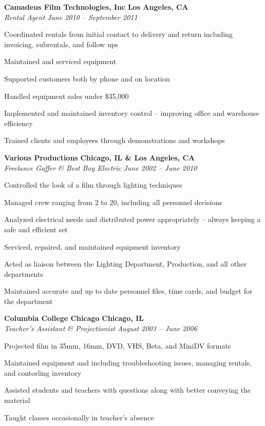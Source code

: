 \documentclass[10pt,letterpaper]{article}			%
\newcommand{\JobHeader}[4]{							%
			\vspace{-.4em}
			\textbf{#1}
			\hfill
			\textbf{#2}
			\\
			\emph{#3}
			\hfill
			\emph{#4}\par
			\vspace{-1em}
			}
\begin{document}
	\JobHeader{Camadeus Film Technologies, Inc}{Los Angeles, CA}{Rental Agent}{June 2010 -- September 2011}
		\begin{itemize*}
		\item Coordinated rentals from initial contact to delivery and return including invoicing, subrentals, and follow ups
		\item Maintained and serviced equipment
		\item Supported customers both by phone and on location
		\item Handled equipment sales under \$35,000
		\item Implemented and maintained inventory control -- improving office and warehouse efficiency
		\item Trained clients and employees through demonstrations and workshops
		\end{itemize*}

	\JobHeader{Various Productions}{Chicago, IL \& Los Angeles, CA}{Freelance Gaffer \& Best Boy Electric}{June 2002 -- June 2010}
		\begin{itemize*}
		\item Controlled the look of a film through lighting techniques 
		\item Managed crew ranging from 2 to 20, including all personnel decisions
		\item Analyzed electrical needs and distributed power appropriately -- always keeping a safe and efficient set
		\item Serviced, repaired, and maintained equipment inventory
		\item Acted as liaison between the Lighting Department, Production, and all other departments
		\item Maintained accurate and up to date personnel files, time cards, and budget for the department
		\end{itemize*}

	\JobHeader{Columbia College Chicago}{Chicago, IL}{Teacher's Assistant \& Projectionist}{August 2003 -- June 2006}
		\begin{itemize*}
		\item Projected film in 35mm, 16mm, DVD, VHS, Beta, and MiniDV formats 
		\item Maintained equipment and including troubleshooting issues, managing rentals, and contorling inventory
		\item Assisted students and teachers with questions along with better conveying the material
		\item Taught classes occasionally in teacher's absence
		\end{itemize*}
		
\end{document}
